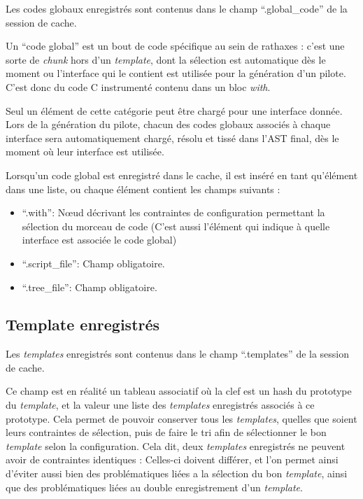 \documentclass[french]{rtxreport}
\begin{document}
Les codes globaux enregistrés sont contenus dans le champ ``.global\_code'' de
la session de cache.

Un ``code global'' est un bout de code spécifique au sein de rathaxes : c'est
une sorte de \emph{chunk} hors d'un \emph{template}, dont la sélection est
automatique dès le moment ou l'interface qui le contient est utilisée pour la
génération d'un pilote. C'est donc du code C instrumenté contenu dans un bloc
\emph{with}.

Seul un élément de cette catégorie peut être chargé pour une interface donnée.
Lors de la génération du pilote, chacun des codes globaux associés à chaque
interface sera automatiquement chargé, résolu et tissé dans l'AST final, dès le
moment où leur interface est utilisée.

Lorsqu'un code global est enregistré dans le cache, il est inséré en tant
qu'élément dans une liste, ou chaque élément contient les champs suivants :
\begin{itemize}
    \item ``.with'': Nœud décrivant les contraintes de configuration
        permettant la sélection du morceau de code (C'est aussi l'élément qui
        indique à quelle interface est associée le code global)
    \item ``.script\_file'': Champ obligatoire.
    \item ``.tree\_file'': Champ obligatoire.
\end{itemize}


\subsection{Template enregistrés}

Les \emph{templates} enregistrés sont contenus dans le champ ``.templates'' de
la session de cache.

Ce champ est en réalité un tableau associatif où la clef est un hash du
prototype du \emph{template}, et la valeur une liste des \emph{templates}
enregistrés associés à ce prototype. Cela permet de pouvoir conserver tous les
\emph{templates}, quelles que soient leurs contraintes de sélection, puis de
faire le tri afin de sélectionner le bon \emph{template} selon la
configuration. Cela dit, deux \emph{templates} enregistrés ne peuvent avoir de
contraintes identiques : Celles-ci doivent différer, et l'on permet ainsi
d'éviter aussi bien des problématiques liées a la sélection du bon
\emph{template}, ainsi que des problématiques liées au double enregistrement
d'un \emph{template}.
\end{document}
